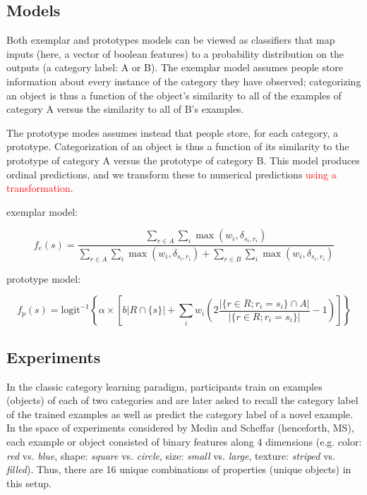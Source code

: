 \documentclass{article}
\newcommand{\red}[1]{\textcolor{Red}{#1}}
\newcommand{\lou}[1]{\textcolor{orange}{[lou: #1]}}
\begin{document}


\subsection{Models}

Both exemplar and prototypes models can be viewed as classifiers that map inputs (here, a vector of boolean features) to a probability distribution on the outputs (a category label: A or B).
The exemplar model assumes people store information about every instance of the category they have observed; categorizing an object is thus a function of the object's similarity to all of the examples of category A versus the similarity to all of B's examples.

The prototype modes assumes instead that people store, for each category, a prototype. Categorization of an object is thus a function of its similarity to the prototype of category A versus the prototype of category B.
This model produces ordinal predictions, and we transform these to numerical predictions \red{using a transformation}.

exemplar model:

$$ f_e(s) = \frac{ \sum\limits_{r \in A}{\sum\limits_{i}\max (w_i, \delta_{s_i, r_i})} }{
  \sum\limits_{r \in A}{\sum\limits_{i}\max (w_i, \delta_{s_i, r_i} )} + \sum\limits_{r \in B}{\sum\limits_{i}\max (w_i, \delta_{s_i, r_i})}
} $$

prototype model:

$$ f_p(s) = \mathrm{logit}^{-1}\left\{ \alpha \times \left[ b|R \cap \{s\}| + \sum\limits_{i}w_i \left(2\frac{|\{r \in R ; r_i = s_i \} \cap A |}{|\{r \in R ; r_i = s_i \}|} - 1\right) \right] \right\} $$


\subsection{Experiments}

In the classic category learning paradigm, participants train on examples (objects) of each of two categories and are later asked to recall the category label of the trained examples as well as predict the category label of a novel example.
In the space of experiments considered by Medin and Scheffar (henceforth, MS), each example or object consisted of binary features along 4 dimensions (e.g. color: \emph{red} vs. \emph{blue}, shape: \emph{square} vs. \emph{circle}, size: \emph{small} vs. \emph{large}, texture: \emph{striped} vs. \emph{filled}).
Thus, there are 16 unique combinations of properties (unique objects) in this setup.
\end{document}
